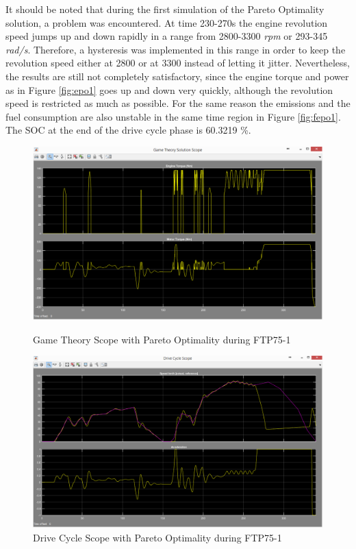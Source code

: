 It should be noted that during the first simulation of the Pareto Optimality solution, a problem was encountered. At time 230-270s the engine revolution speed jumps up and down rapidly in a range from 2800-3300 \textit{rpm} or 293-345 \textit{rad/s}. Therefore, a hysteresis was implemented in this range in order to keep the revolution speed either at 2800 or at 3300 instead of letting it jitter. Nevertheless, the results are still not completely satisfactory, since the engine torque and power as in Figure \ref{fig:epo1} goes up and down very quickly, although the revolution speed is restricted as much as possible. For the same reason the emissions and the fuel consumption are also unstable in the same time region in Figure \ref{fig:fepo1}. The SOC at the end of the drive cycle phase is 60.3219 \%.

\begin{figure}[hp]
\centering
\includegraphics[scale=0.45]{figures/Pareto/FTP75-1/gameTheory30Juni}
\caption{Game Theory Scope with Pareto Optimality during FTP75-1}
\label{fig:gtpo1}
\includegraphics[scale=0.41]{figures/Pareto/FTP75-1/driveCycle30Juni}
\caption{Drive Cycle Scope with Pareto Optimality during FTP75-1}
\label{fig:dcpo1}
\end{figure}


